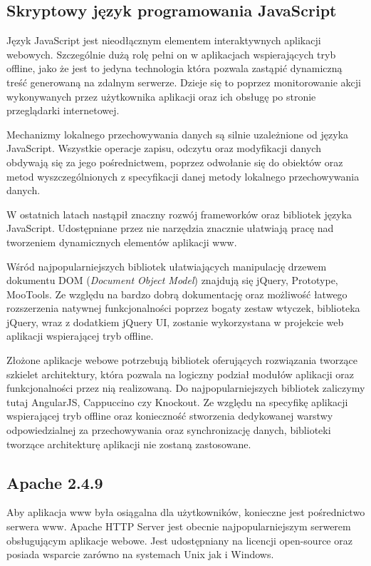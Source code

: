 \subsection{Skryptowy język programowania JavaScript}
\label{sec:js}

Język JavaScript jest nieodłącznym elementem interaktywnych aplikacji webowych. Szczególnie dużą rolę pełni on w aplikacjach wspierających tryb offline, jako że jest to jedyna technologia która pozwala zastąpić dynamiczną treść generowaną na zdalnym serwerze. Dzieje się to poprzez monitorowanie akcji wykonywanych przez użytkownika aplikacji oraz ich obsługę po stronie przeglądarki internetowej.

Mechanizmy lokalnego przechowywania danych są silnie uzależnione od języka JavaScript. Wszystkie operacje zapisu, odczytu oraz modyfikacji danych obdywają się za jego pośrednictwem, poprzez odwołanie się do obiektów oraz metod wyszczególnionych z specyfikacji danej metody lokalnego przechowywania danych.

W ostatnich latach nastąpił znaczny rozwój frameworków oraz bibliotek języka JavaScript. Udostępniane przez nie narzędzia znacznie ułatwiają pracę nad tworzeniem dynamicznych elementów aplikacji www.

Wśród najpopularniejszych bibliotek ułatwiających manipulację drzewem dokumentu DOM (\emph{Document Object Model}) znajdują się jQuery, Prototype, MooTools. Ze względu na bardzo dobrą dokumentację oraz możliwość łatwego rozszerzenia natywnej funkcjonalności poprzez bogaty zestaw wtyczek, biblioteka jQuery, wraz z dodatkiem jQuery UI, zostanie wykorzystana w projekcie web aplikacji wspierającej tryb offline.

Złożone aplikacje webowe potrzebują bibliotek oferujących rozwiązania tworzące szkielet architektury, która pozwala na logiczny podział modułów aplikacji oraz funkcjonalności przez nią realizowaną. Do najpopularniejszych bibliotek zaliczymy tutaj AngularJS, Cappuccino czy Knockout. Ze względu na specyfikę aplikacji wspierającej tryb offline oraz konieczność stworzenia dedykowanej warstwy odpowiedzialnej za przechowywania oraz synchronizację danych, biblioteki tworzące architekturę aplikacji nie zostaną zastosowane.

\subsection{Apache 2.4.9}
\label{sec:apache}

Aby aplikacja www była osiągalna dla użytkowników, konieczne jest pośrednictwo serwera www. Apache HTTP Server jest obecnie najpopularniejszym serwerem obsługującym aplikacje webowe. Jest udostępniany na licencji open-source oraz posiada wsparcie zarówno na systemach Unix jak i Windows.

